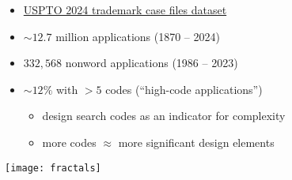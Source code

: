 \documentclass[aspectratio = 1610]{beamer}
\begin{document}
\begin{frame}

\begin{itemize}

\item \href{https://www.uspto.gov/ip-policy/economic-research/research-datasets/trademark-case-files-dataset}{USPTO 2024 trademark case files dataset}
\item $\sim 12.7$ million applications (1870 – 2024)
\item $332,568$ nonword applications (1986 – 2023)
\item $\sim 12\%$ with $> 5$ codes (``high-code applications'')
\begin{itemize}
\item design search codes as an indicator for complexity
\item more codes $\approx$ more significant design elements
\end{itemize}

\end{itemize}

\centering

\texttt{[image: fractals]}

\end{frame}

\begin{frame}

\centering



\end{frame}

\begin{frame}

\centering



\end{frame}

\begin{frame}

\centering



\end{frame}

\begin{frame}

\centering



\end{frame}
\end{document}
